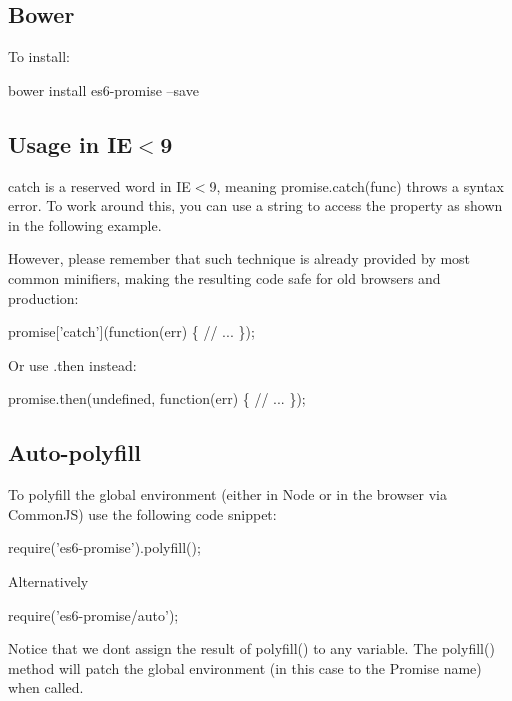 \subsection*{Bower}

To install\+:


\begin{DoxyCode}
bower install es6-promise --save
\end{DoxyCode}


\subsection*{Usage in IE$<$9}

{\ttfamily catch} is a reserved word in IE$<$9, meaning {\ttfamily promise.\+catch(func)} throws a syntax error. To work around this, you can use a string to access the property as shown in the following example.

However, please remember that such technique is already provided by most common minifiers, making the resulting code safe for old browsers and production\+:


\begin{DoxyCode}
promise['catch'](function(err) \{
  // ...
\});
\end{DoxyCode}


Or use {\ttfamily .then} instead\+:


\begin{DoxyCode}
promise.then(undefined, function(err) \{
  // ...
\});
\end{DoxyCode}


\subsection*{Auto-\/polyfill}

To polyfill the global environment (either in Node or in the browser via Common\+JS) use the following code snippet\+:


\begin{DoxyCode}
require('es6-promise').polyfill();
\end{DoxyCode}


Alternatively


\begin{DoxyCode}
require('es6-promise/auto');
\end{DoxyCode}


Notice that we don\textquotesingle{}t assign the result of {\ttfamily polyfill()} to any variable. The {\ttfamily polyfill()} method will patch the global environment (in this case to the {\ttfamily Promise} name) when called.

